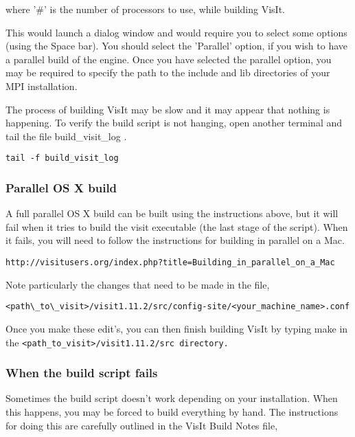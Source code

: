 \normalfont where '\#' is the number of processors to use, while building VisIt. 

This would launch a dialog window and would require you to select some options (using the Space bar). You should select the 'Parallel' option, if you wish to have a parallel build of the engine. Once you have selected the parallel option, you may be required to specify the path to the include and lib directories of your MPI installation. 

The process of building VisIt may be slow and it may appear that nothing is happening. To verify the build script is not hanging, open another terminal and tail the file build\_visit\_log	. 

\begin{Verbatim}[fontsize=\footnotesize]
tail -f build_visit_log
\end{Verbatim}

\normalfont  
\subsubsection{Parallel OS X build}
\label{sec:ParallelOSXBuild}

A full parallel OS X build can be built using the instructions above, but it will fail when it tries to build the visit executable (the last stage of the script). When it fails, you will need to follow the instructions for building in parallel on a Mac. 

\begin{Verbatim}[fontsize=\footnotesize]
http://visitusers.org/index.php?title=Building_in_parallel_on_a_Mac
\end{Verbatim}
  
Note particularly the changes that need to be made in the file, 

\begin{Verbatim}[fontsize=\footnotesize]
<path\_to\_visit>/visit1.11.2/src/config-site/<your_machine_name>.conf
\end{Verbatim}

\normalfont Once you make these edit's, you can then finish building VisIt by typing make in the \tt <path\_to\_visit>/visit1.11.2/src \normalfont directory.  

\subsubsection{When the build script fails}
\label{sec:WhenTheBuildsSriptFails}

Sometimes the build script doesn't work depending on your installation. When this happens, you may be forced to build everything by hand. The instructions for doing this are carefully outlined in the VisIt Build Notes file, 

